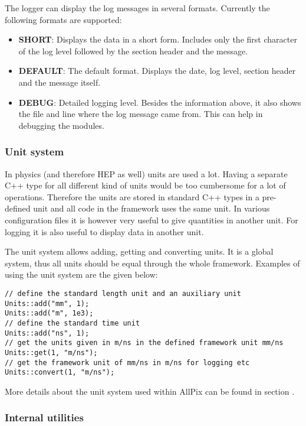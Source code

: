 The logger can display the log messages in several formats. Currently the following formats are supported:
\begin{itemize}
\item \textbf{SHORT}: Displays the data in a short form. Includes only the first character of the log level followed by the section header and the message.
\item \textbf{DEFAULT}: The default format. Displays the date, log level, section header and the message itself. 
\item \textbf{DEBUG}: Detailed logging level. Besides the information above, it also shows the file and line where the log message came from. This can help in debugging the modules.
\end{itemize}

\subsubsection{Unit system}
\label{sec:unit_system}
In physics (and therefore HEP as well) units are used a lot. Having a separate C++ type for all different kind of units would be too cumbersome for a lot of operations. Therefore the units are stored in standard C++ types in a pre-defined unit and all code in the framework uses the same unit. In various configuration files it is however very useful to give quantities in another unit. For logging it is also useful to display data in another unit.

The unit system allows adding, getting and converting units. It is a global system, thus all units should be equal through the whole framework. Examples of using the unit system are the given below:
\begin{verbatim}
// define the standard length unit and an auxiliary unit
Units::add("mm", 1); 
Units::add("m", 1e3); 
// define the standard time unit
Units::add("ns", 1); 
// get the units given in m/ns in the defined framework unit mm/ns
Units::get(1, "m/ns"); 
// get the framework unit of mm/ns in m/ns for logging etc
Units::convert(1, "m/ns");
\end{verbatim}

More details about the unit system used within AllPix can be found in section \needref.

\subsubsection{Internal utilities}
